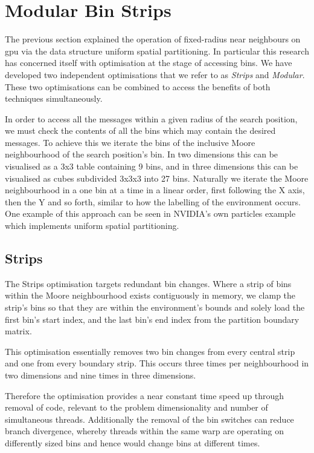 \section{Modular Bin Strips\label{sec:innovation}}
  The previous section explained the operation of fixed-radius near neighbours on \gls{gpu} via the data structure uniform spatial partitioning. In particular this research has concerned itself with optimisation at the stage of accessing bins. We have developed two independent optimisations that we refer to as \textit{Strips} and \textit{Modular}. These two optimisations can be combined to access the benefits of both techniques simultaneously.
  
  
  In order to access all the messages within a given radius of the search position, we must check the contents of all the bins which may contain the desired messages. To achieve this we iterate the bins of the inclusive Moore neighbourhood of the search position's bin. In two dimensions this can be visualised as a 3x3 table containing 9 bins, and in three dimensions this can be visualised as cubes subdivided 3x3x3 into 27 bins. Naturally we iterate the Moore neighbourhood in a one bin at a time in a linear order, first following the X axis, then the Y and so forth, similar to how the labelling of the environment occurs. One example of this approach can be seen in NVIDIA's own particles example which implements uniform spatial partitioning.
  \subsection{Strips}
    The Strips optimisation targets redundant bin changes. Where a strip of bins within the Moore neighbourhood exists contiguously in memory, we clamp the strip's bins so that they are within the environment's bounds and  solely load the first bin's start index, and the last bin's end index from the partition boundary matrix.
    
    This optimisation essentially removes two bin changes from every central strip and one from every boundary strip. This occurs three times per neighbourhood in two dimensions and nine times in three dimensions. 
    
    Therefore the optimisation provides a near constant time speed up through removal of code, relevant to the problem dimensionality and number of simultaneous threads. Additionally the removal of the bin switches can reduce branch divergence, whereby threads within the same warp are operating on differently sized bins and hence would change bins at different times.
    
